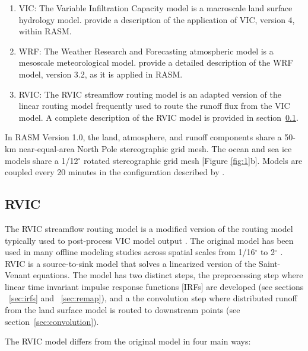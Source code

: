 \documentclass[jgrga, draft]{agutex}
\begin{document}
\begin{article}
\begin{enumerate}
\item VIC: The Variable Infiltration Capacity model \citep{Liang_1996} is a macroscale land surface hydrology model.
\citet{Hamman_2016} provide a description of the application of VIC, version 4, within RASM.
\item WRF: The Weather Research and Forecasting atmospheric model \citep{Skamarock_2007} is a mesoscale meteorological model.
\citet{Cassano_2016} provide a detailed description of the WRF model, version 3.2, as it is applied in RASM.
\item RVIC: The RVIC streamflow routing model is an adapted version of the \citet{Lohmann_1996} linear routing model frequently used to route the runoff flux from the VIC model.
A complete description of the RVIC model is provided in section~\ref{sec:rvic}.
\end{enumerate}

In RASM Version 1.0, the land, atmosphere, and runoff components share a 50-km near-equal-area North Pole stereographic grid mesh.
The ocean and sea ice models share a 1/12$^{\circ}$ rotated stereographic grid mesh [Figure \ref{fig:1}b].
Models are coupled every 20 minutes in the configuration described by \citet{Roberts_2015a}.

\subsection{RVIC}
\label{sec:rvic}

The RVIC streamflow routing model is a modified version of the routing model typically used to post-process VIC model output \citep{Lohmann_1996, Lohmann_1998a}.
The original \citet{Lohmann_1996} model has been used in many offline modeling studies across spatial scales from 1/16$^{\circ}$ to 2$^{\circ}$ \citep[e.g.][]{Nijssen_1997,Lohmann_1998b,Su_2005}.
RVIC is a source-to-sink model that solves a linearized version of the Saint-Venant equations.
The model has two distinct steps, the preprocessing step where linear time invariant impulse response functions [IRFs] are developed (see sections ~\ref{sec:irfs} and ~\ref{sec:remap}), and a the convolution step where distributed runoff from the land surface model is routed to downstream points (see section~\ref{sec:convolution}).

The RVIC model differs from the original \citet{Lohmann_1996} model in four main ways:


\end{article}
\end{document}
